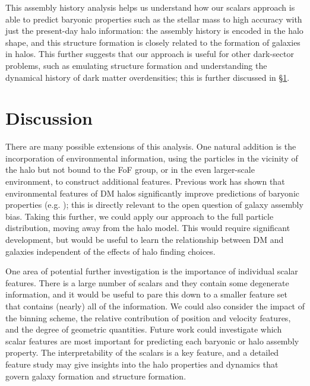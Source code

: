 This assembly history analysis helps us understand how our scalars approach is able to predict baryonic properties such as the stellar mass to high accuracy with just the present-day halo information: the assembly history is encoded in the halo shape, and this structure formation is closely related to the formation of galaxies in halos.
This further suggests that our approach is useful for other dark-sector problems, such as emulating structure formation and understanding the dynamical history of dark matter overdensities; this is further discussed in \S\ref{sec:discussion}. 


\section{Discussion}
\label{sec:discussion}

There are many possible extensions of this analysis.
One natural addition is the incorporation of environmental information, using the particles in the vicinity of the halo but not bound to the FoF group, or in the even larger-scale environment, to construct additional features.
Previous work has shown that environmental features of DM halos significantly improve predictions of baryonic properties (e.g. \citealt{jo_machine-assisted_2019}); this is directly relevant to the open question of galaxy assembly bias.
Taking this further, we could apply our approach to the full particle distribution, moving away from the halo model.
This would require significant development, but would be useful to learn the relationship between DM and galaxies independent of the effects of halo finding choices.

One area of potential further investigation is the importance of individual scalar features.
There is a large number of scalars and they contain some degenerate information, and it would be useful to pare this down to a smaller feature set that contains (nearly) all of the information.
We could also consider the impact of the binning scheme, the relative contribution of position and velocity features, and the degree of geometric quantities.
Future work could investigate which scalar features are most important for predicting each baryonic or halo assembly property.
The interpretability of the scalars is a key feature, and a detailed feature study may give insights into the halo properties and dynamics that govern galaxy formation and structure formation.

